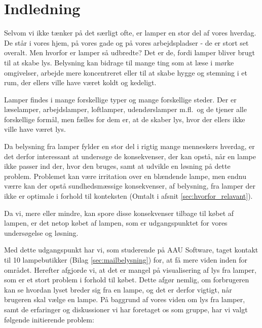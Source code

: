 \section{Indledning}
Selvom vi ikke tænker på det særligt ofte, er lamper en stor del af vores hverdag. De står i vores hjem, på vores gade og på vores arbejdspladser - de er stort set overalt. Men hvorfor er lamper så udbredte? Det er de, fordi lamper bliver brugt til at skabe lys. Belysning kan bidrage til mange ting som at læse i mørke omgivelser, arbejde mere koncentreret eller til at skabe hygge og stemning i et rum, der ellers ville have været koldt og kedeligt. 

Lamper findes i mange forskellige typer og mange forskellige steder. Der er læselamper, arbejdslamper, loftlamper, udendørslamper m.fl.\, og de tjener alle forskellige formål, men fælles for dem er, at de skaber lys, hvor der ellers ikke ville have været lys. 

Da belysning fra lamper fylder en stor del i rigtig mange menneskers hverdag, er det derfor interessant at undersøge de konsekvenser, der kan opstå, når en lampe ikke passer ind der, hvor den bruges, samt at udvikle en løsning på dette problem. Problemet kan være irritation over en blændende lampe, men endnu værre kan der opstå sundhedsmæssige konsekvenser, af belysning, fra lamper der ikke er optimale i forhold til konteksten (Omtalt i afsnit \ref{sec:hvorfor_relavant}).

Da vi, mere eller mindre, kan spore disse konsekvenser tilbage til købet af lampen, er det netop købet af lampen, som er udgangspunktet for vores undersøgelse og løsning.

Med dette udgangspunkt har vi, som studerende på AAU Software, taget kontakt til 10 lampebutikker (Bilag \ref{sec:mailbelysning}) for, at få mere viden inden for området. Herefter afgjorde vi, at det er mangel på visualisering af lys fra lamper, som er et stort problem i forhold til købet. Dette afgør nemlig, om forbrugeren kan se hvordan lyset breder sig fra en lampe, og det er derfor vigtigt, når brugeren skal vælge en lampe. På baggrund af vores viden om lys fra lamper, samt de erfaringer og diskussioner vi har foretaget os som gruppe, har vi valgt følgende initierende problem:


\clearpage
